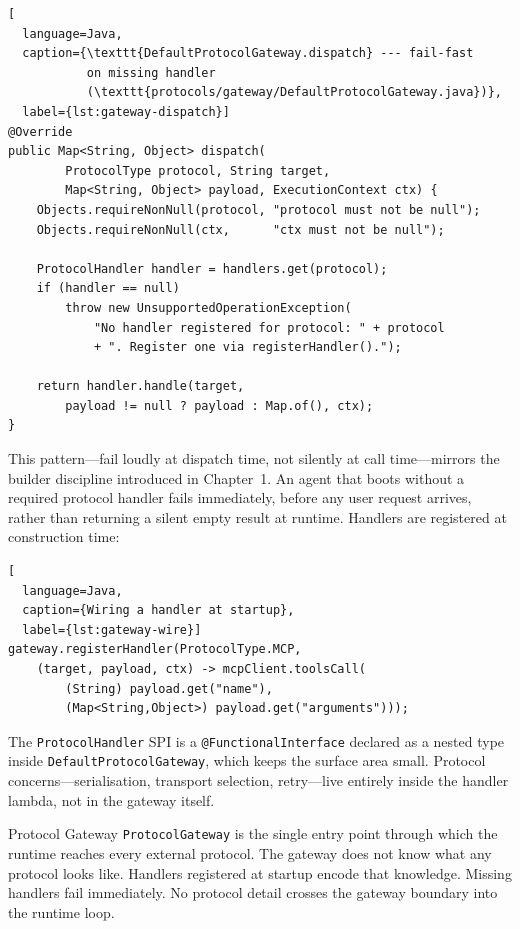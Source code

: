 \begin{lstlisting}[
  language=Java,
  caption={\texttt{DefaultProtocolGateway.dispatch} --- fail-fast
           on missing handler
           (\texttt{protocols/gateway/DefaultProtocolGateway.java})},
  label={lst:gateway-dispatch}]
@Override
public Map<String, Object> dispatch(
        ProtocolType protocol, String target,
        Map<String, Object> payload, ExecutionContext ctx) {
    Objects.requireNonNull(protocol, "protocol must not be null");
    Objects.requireNonNull(ctx,      "ctx must not be null");

    ProtocolHandler handler = handlers.get(protocol);
    if (handler == null)
        throw new UnsupportedOperationException(
            "No handler registered for protocol: " + protocol
            + ". Register one via registerHandler().");

    return handler.handle(target,
        payload != null ? payload : Map.of(), ctx);
}
\end{lstlisting}

This pattern---fail loudly at dispatch time, not silently at call
time---mirrors the builder discipline introduced in Chapter~1.  An
agent that boots without a required protocol handler fails
immediately, before any user request arrives, rather than returning
a silent empty result at runtime.  Handlers are registered at
construction time:

\begin{lstlisting}[
  language=Java,
  caption={Wiring a handler at startup},
  label={lst:gateway-wire}]
gateway.registerHandler(ProtocolType.MCP,
    (target, payload, ctx) -> mcpClient.toolsCall(
        (String) payload.get("name"),
        (Map<String,Object>) payload.get("arguments")));
\end{lstlisting}

The \lstinline{ProtocolHandler} SPI is a
\lstinline{@FunctionalInterface} declared as a nested type inside
\lstinline{DefaultProtocolGateway}, which keeps the surface area
small.  Protocol concerns---serialisation, transport selection,
retry---live entirely inside the handler lambda, not in the gateway
itself.

\begin{takeawaybox}{Protocol Gateway}
\lstinline{ProtocolGateway} is the single entry point through which
the runtime reaches every external protocol.  The gateway does not
know what any protocol looks like.  Handlers registered at startup
encode that knowledge.  Missing handlers fail immediately.  No
protocol detail crosses the gateway boundary into the runtime loop.
\end{takeawaybox}

